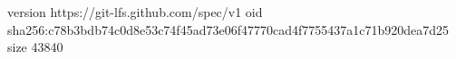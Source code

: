 version https://git-lfs.github.com/spec/v1
oid sha256:c78b3bdb74c0d8e53c74f45ad73e06f47770cad4f7755437a1c71b920dea7d25
size 43840
